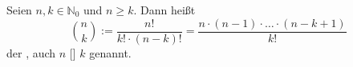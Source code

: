 Seien $n, k \in \mathbb{N}_0$ und $n \geq k$. Dann heißt
$$
\binom{n}{k} := \frac{n!}{k! \cdot (n-k)!} 
= \frac{n \cdot (n-1) \cdot \ldots \cdot (n-k+1)}{k!}
$$
der , auch $n$ [] $k$ genannt.